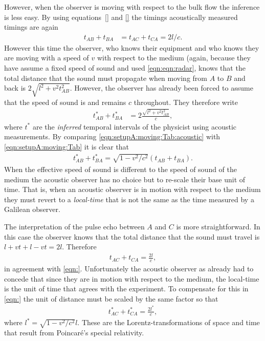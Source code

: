 \documentclass[10pt, fleqn,draft,showtrims,oldfontcommands]{article} %
\newcommand{\eqnref}[1]{\ref{eqn:#1}}
\newcommand{\lr}[1]{\left( #1 \right)}
\newcommand{\Poincare}{Poincar{\'e}}
\begin{document}
However, when the observer is moving with respect to the bulk flow the inference is less easy.
By using equations~\ref{} and \ref{}  the timings acoustically measured timings are again
\begin{align}
  t_{AB}+t_{BA}  &= t_{AC}+t_{CA} = 2l/c.
\end{align}
However this time the observer, who knows their equipment and who knows they are moving with a speed of $v$ with respect to the medium 
(again,  because they have assume a fixed speed of sound and used \eqnref{eqn:radar},
knows that the total distance that the sound must  propagate when moving from $A$ to $B$ and back is $2\sqrt{l^2+v^2t_{AB}^2}$.
However, the observer has already been forced to assume that the speed of sound is and remains $c$ throughout.
They therefore write
\begin{align}
 t_{AB}^\ast+t_{BA}^\ast  &= 2\frac{\sqrt{l^2+v^2t_{AB}^2}}{c},\label{eqn:setupA:moving:Tab:acoustic}
\end{align}
where $t^\ast$ are the {\em inferred} temporal intervals of the physicist using acoustic measurements.
By comparing \eqnref{setupA:moving:Tab:acoustic} with \eqnref{setupA:moving:Tab} it is clear that
\begin{align}
 t_{AB}^\ast+t_{BA}^\ast = \sqrt{1-v^2/c^2}\lr{t_{AB}+t_{BA}}.
\end{align}
When the effective speed of sound  is different to  the speed of sound of the medium
the acoustic observer has no choice but to re-scale their base unit of time.
That is, when an acoustic observer is in motion with respect to the medium 
they must revert to a {\em local-time} that is not the same as the time measured by a Galilean observer.

The interpretation of the pulse echo between $A$ and $C$ is more straightforward.
In this case the observer knows that the total distance that the sound must travel is $l +vt + l - vt = 2l$.
Therefore 
\begin{align}
  t_{AC}+t_{CA} = \frac{2l}{c},
\end{align}
in agreement with \eqnref{}.
Unfortunately the acoustic observer as already had to concede that since they are in motion with respect to the medium,
the local-time is the unit of time that agrees with the  experiment.
To compensate for this in \eqnref{}
the unit of distance must be scaled by the same factor so that
\begin{align}
  t_{AC}^\ast+t_{CA}^\ast = \frac{2l^\ast}{c},
\end{align}
where $l^\ast = \sqrt{1-v^2/c^2} l$.
These are the Lorentz-transformations of space and time that result from \Poincare's special relativity.
\end{document}

